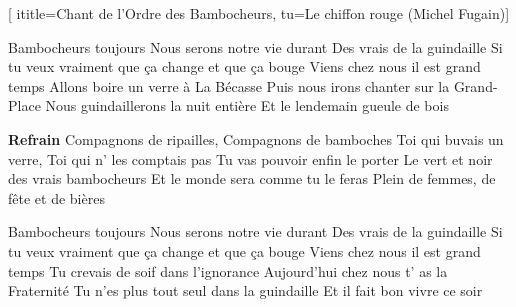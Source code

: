  [
ititle={Chant de l'Ordre des Bambocheurs},
tu={Le chiffon rouge (Michel Fugain)}]

\beginverse
Bambocheurs toujours
Nous serons notre vie durant
Des vrais de la guindaille
Si tu veux vraiment que ça change et que ça bouge
Viens chez nous il est grand temps
Allons boire un verre à La Bécasse
Puis nous irons chanter sur la Grand-Place
Nous guindaillerons la nuit entière
Et le lendemain gueule de bois
\endverse

\beginchorus
\textbf{Refrain}
Compagnons de ripailles,
Compagnons de bamboches
Toi qui buvais un verre,
Toi qui n' les comptais pas
Tu vas pouvoir enfin le porter
Le vert et noir des vrais bambocheurs
Et le monde sera comme tu le feras
Plein de femmes, de fête et de bières
\endchorus

\beginverse
Bambocheurs toujours
Nous serons notre vie durant
Des vrais de la guindaille
Si tu veux vraiment que ça change et que ça bouge
Viens chez nous il est grand temps
Tu crevais de soif dans l'ignorance
Aujourd'hui chez nous t' as la Fraternité
Tu n'es plus tout seul dans la guindaille
Et il fait bon vivre ce soir
\endverse
\endsong